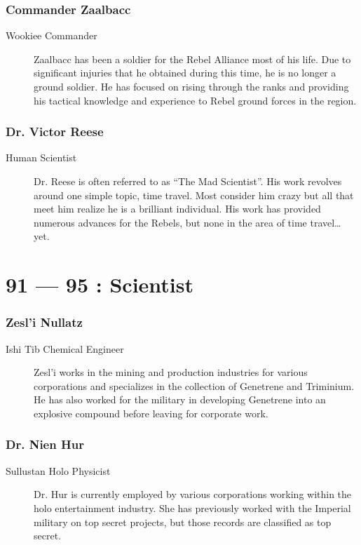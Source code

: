\documentclass{article}
\begin{document}
\section{Commander Zaalbacc}
\begin{description}
	\item [Wookiee \male Commander] Zaalbacc has been a soldier for the Rebel Alliance most of his life. Due to significant injuries that he obtained during this time, he is no longer a ground soldier. He has focused on rising through the ranks and providing his tactical knowledge and experience to Rebel ground forces in the region.
\end{description}
\section{Dr. Victor Reese}
\begin{description}
	\item [Human \male Scientist] Dr. Reese is often referred to as “The Mad Scientist”. His work revolves around one simple topic, time travel. Most consider him crazy but all that meet him realize he is a brilliant individual. His work has provided numerous advances for the Rebels, but none in the area of time travel… yet.
\end{description}

\part*{91 --- 95 : Scientist}
\setcounter{section}{90}
\section{Zesl’i Nullatz}
\begin{description}
	\item [Ishi Tib \male Chemical Engineer] Zesl’i works in the mining and production industries for various corporations and specializes in the collection of Genetrene and Triminium. He has also worked for the military in developing Genetrene into an explosive compound before leaving for corporate work.
\end{description}
\section{Dr. Nien Hur}
\begin{description}
	\item [Sullustan \female Holo Physicist] Dr. Hur is currently employed by various corporations working within the holo entertainment industry. She has previously worked with the Imperial military on top secret projects, but those records are classified as top secret.
\end{description}
\end{document}
